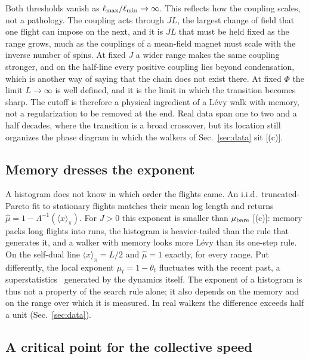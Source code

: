 Both thresholds vanish as $\ell_{\max}/\ell_{\min}\to\infty$. This reflects how the coupling scales, not a pathology. The coupling acts through $JL$, the largest change of field that one flight can impose on the next, and it is $JL$ that must be held fixed as the range grows, much as the couplings of a mean-field magnet must scale with the inverse number of spins. At fixed $J$ a wider range makes the same coupling stronger, and on the half-line every positive coupling lies beyond condensation, which is another way of saying that the chain does not exist there. At fixed $\Phi$ the limit $L\to\infty$ is well defined, and it is the limit in which the transition becomes sharp. The cutoff is therefore a physical ingredient of a L\'evy walk with memory, not a regularization to be removed at the end. Real data span one to two and a half decades, where the transition is a broad crossover, but its location still organizes the phase diagram in which the walkers of Sec.~\ref{sec:data} sit [(c)].

\subsection{Memory dresses the exponent}\label{sec:dressing}

A histogram does not know in which order the flights came. An i.i.d.\ truncated-Pareto fit to stationary flights matches their mean log length and returns $\hat\mu=1-\Lambda^{-1}(\langle x\rangle_\pi)$. For $J>0$ this exponent is smaller than $\mu_{\rm bare}$ [(c)]: memory packs long flights into runs, the histogram is heavier-tailed than the rule that generates it, and a walker with memory looks more L\'evy than its one-step rule. On the self-dual line $\langle x\rangle_\pi=L/2$ and $\hat\mu=1$ exactly, for every range. Put differently, the local exponent $\mu_t=1-\theta_t$ fluctuates with the recent past, a superstatistics~\cite{BeckCohen2003} generated by the dynamics itself. The exponent of a histogram is thus not a property of the search rule alone; it also depends on the memory and on the range over which it is measured. In real walkers the difference exceeds half a unit (Sec.~\ref{sec:data}).

\subsection{A critical point for the collective speed}\label{sec:meanfield}


